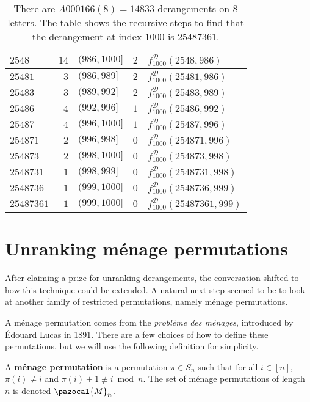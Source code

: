 \begin{table}
\begin{tabular}{|l|r|l|c|l|}
  $2548    $ & $14$   & $(986, 1000]$     & $2$ & $f^{\mathcal{D}}_{1000}(2548, 986)$     \\
  \hline
  $25481   $ & $3$    & $(986, 989]$      & $2$ & $f^{\mathcal{D}}_{1000}(25481, 986)$    \\
  $25483   $ & $3$    & $(989, 992]$      & $2$ & $f^{\mathcal{D}}_{1000}(25483, 989)$    \\
  $25486   $ & $4$    & $(992, 996]$      & $1$ & $f^{\mathcal{D}}_{1000}(25486, 992)$    \\
  $25487   $ & $4$    & $(996, 1000]$     & $1$ & $f^{\mathcal{D}}_{1000}(25487, 996)$    \\
  \hline
  $254871   $ & $2$   & $(996, 998]$      & $0$ & $f^{\mathcal{D}}_{1000}(254871, 996)$   \\
  $254873   $ & $2$   & $(998, 1000]$     & $0$ & $f^{\mathcal{D}}_{1000}(254873, 998)$   \\
  \hline
  $2548731  $ & $1$   & $(998, 999]$      & $0$ & $f^{\mathcal{D}}_{1000}(2548731, 998)$  \\
  $2548736  $ & $1$   & $(999, 1000]$     & $0$ & $f^{\mathcal{D}}_{1000}(2548736, 999)$  \\
  \hline
  $25487361 $ & $1$   & $(999, 1000]$     & $0$ & $f^{\mathcal{D}}_{1000}(25487361, 999)$ \\
  \hline
\end{tabular}
\caption[Steps for computing the $1000$th derangement in $S_8$]{
  There are $A000166(8) = 14833$ derangements on $8$ letters.
  The table shows the recursive steps to find that the derangement at index
  $1000$ is $25487361$.
}
\label{table:unrankDerangement}
\end{table}

\section{Unranking m\'enage permutations}
\label{sec:unrankingMenage}
After claiming a prize for unranking derangements, the conversation shifted to
how this technique could be extended. A natural next step seemed to be to look
at another family of restricted permutations, namely m\'enage permutations.

A m\'enage permutation comes from the \textit{probl\`eme des m\'enages},
introduced by \'Edouard Lucas in 1891.
There are a few choices of how to define these permutations, but we will
use the following definition for simplicity.
\begin{definition}
  A \textbf{m\'enage permutation} is a permutation $\pi \in S_n$ such that for
  all $i \in [n]$,
  $\pi(i) \neq i$ and
  $\pi(i) + 1 \not\equiv i \bmod n$.
  The set of m\'enage permutations of length $n$ is denoted $\pazocal{M}_n$.
\end{definition}

